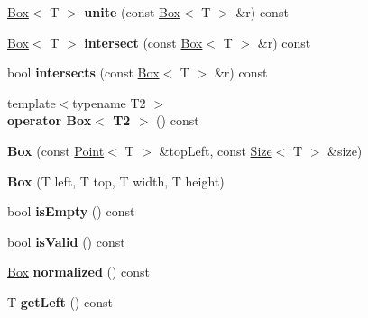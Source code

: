 \begin{DoxyCompactItemize}
\item 
\hypertarget{class_box_aeed25d0e0ffb49e8e77ca3bd36509017}{
\hyperlink{class_box}{Box}$<$ T $>$ {\bfseries unite} (const \hyperlink{class_box}{Box}$<$ T $>$ \&r) const }
\label{class_box_aeed25d0e0ffb49e8e77ca3bd36509017}

\item 
\hypertarget{class_box_a88cd9779de891c4c86f5a6ebc53f6e16}{
\hyperlink{class_box}{Box}$<$ T $>$ {\bfseries intersect} (const \hyperlink{class_box}{Box}$<$ T $>$ \&r) const }
\label{class_box_a88cd9779de891c4c86f5a6ebc53f6e16}

\item 
\hypertarget{class_box_aac069f504fa8b0efde1817ec25bf72ca}{
bool {\bfseries intersects} (const \hyperlink{class_box}{Box}$<$ T $>$ \&r) const }
\label{class_box_aac069f504fa8b0efde1817ec25bf72ca}

\item 
\hypertarget{class_box_a59ff93ffee6386885d5eb5cb13610b95}{
{\footnotesize template$<$typename T2 $>$ }\\{\bfseries operator Box$<$ T2 $>$} () const }
\label{class_box_a59ff93ffee6386885d5eb5cb13610b95}

\item 
\hypertarget{class_box_ad8f5cd82926a0d9249167b4c1e4be4cc}{
{\bfseries Box} (const \hyperlink{class_point}{Point}$<$ T $>$ \&topLeft, const \hyperlink{class_size}{Size}$<$ T $>$ \&size)}
\label{class_box_ad8f5cd82926a0d9249167b4c1e4be4cc}

\item 
\hypertarget{class_box_adacfc3678389e68945da2976da8693ec}{
{\bfseries Box} (T left, T top, T width, T height)}
\label{class_box_adacfc3678389e68945da2976da8693ec}

\item 
\hypertarget{class_box_ae312de0c0f0bc30588cf928c8ea648d1}{
bool {\bfseries isEmpty} () const }
\label{class_box_ae312de0c0f0bc30588cf928c8ea648d1}

\item 
\hypertarget{class_box_abe6f8df2b637e9b16d4ee3e7a7d17d2b}{
bool {\bfseries isValid} () const }
\label{class_box_abe6f8df2b637e9b16d4ee3e7a7d17d2b}

\item 
\hypertarget{class_box_a817dc7dc90d3b2b8233630a3a8ffbd4d}{
\hyperlink{class_box}{Box} {\bfseries normalized} () const }
\label{class_box_a817dc7dc90d3b2b8233630a3a8ffbd4d}

\item 
\hypertarget{class_box_aed2302c4897867af461de311c6e42c25}{
T {\bfseries getLeft} () const }
\label{class_box_aed2302c4897867af461de311c6e42c25}


\end{DoxyCompactItemize}
